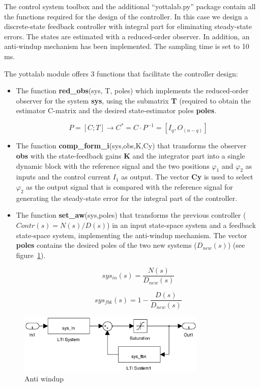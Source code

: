 The control system toolbox and the additional ``yottalab.py'' package contain 
all the functions required for the design of the controller. In this case
we design a discrete-state feedback controller with integral part for 
eliminating steady-state errors. The states are estimated with a reduced-order 
observer.
In addition, an anti-windup mechanism has been implemented. The sampling time 
is set to 10 ms.

The yottalab module offers 3 functions that facilitate the controller 
design:

\begin{itemize}
\item The function \textbf{red\_obs}(sys, T, poles) which implements the 
reduced-order observer for the system \textbf{sys}, using the submatrix 
\textbf{T} (required to obtain the estimator C-matrix 
and the desired state-estimator poles \textbf{poles}.

$$
P = [C;T] \to C^*=C \cdot P^{-1}=[I_q,O_{(n-q)}]
$$

\item The function \textbf{comp\_form\_i}(sys,obs,K,Cy) that transforms the 
observer \textbf{obs} with the state-feedback gains \textbf{K} and the 
integrator part into a single dynamic block with the reference signal and the 
two positions $\varphi_1$ and $\varphi_2$ as inputs and the control current 
$I_1$ as output. The vector \textbf{Cy} is used to select $\varphi_2$ as the 
output signal that is compared with the reference signal for generating the 
steady-state error for the integral part of the controller.

\item The function \textbf{set\_aw}(sys,poles) that transforms the previous 
controller ($Contr(s)=N(s)/D(s)$) in an input state-space system and a feedback 
state-space system, implementing the anti-windup mechanism. The vector 
\textbf{poles} contains the desired poles of the two new systems ($D_{new}(s)$) 
(see figure~\ref{F20a}).

$$
sys_{in}(s) = \frac{N(s)}{D_{new}(s)} 
$$

$$
sys_{fbk}(s) = 1-\frac{D(s)}{D_{new}(s)}
$$

\end{itemize}

\begin{figure}[htbp]	%
\centering
\includegraphics[width=0.8\textwidth]{eps/aw.eps}
\caption{Anti windup}
\label{F20a}
\end{figure}

